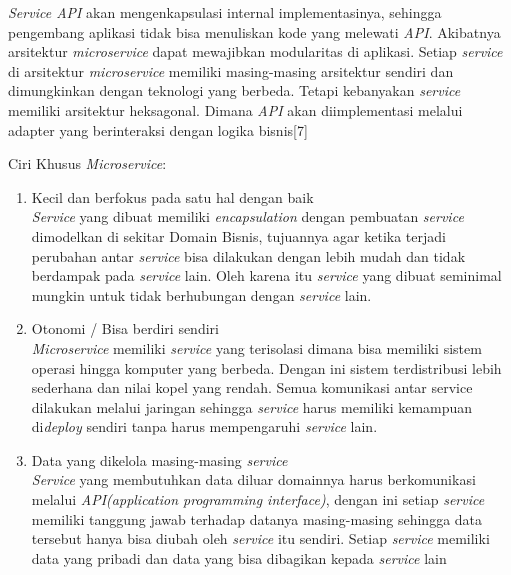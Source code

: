 \textit{Service API} akan mengenkapsulasi internal implementasinya, sehingga pengembang aplikasi tidak bisa menuliskan kode yang melewati \textit{API}. Akibatnya arsitektur \textit{microservice} dapat mewajibkan modularitas di aplikasi.  Setiap \textit{service} di arsitektur \textit{microservice} memiliki masing-masing arsitektur sendiri dan dimungkinkan dengan teknologi yang berbeda. Tetapi kebanyakan \textit{service} memiliki arsitektur heksagonal. Dimana \textit{API} akan diimplementasi melalui adapter yang berinteraksi dengan logika bisnis[7]

Ciri Khusus \textit{Microservice}:	
\begin{enumerate}[leftmargin=1.3cm]
	\item Kecil dan berfokus pada satu hal dengan baik\\
	\textit{Service} yang dibuat memiliki \textit{encapsulation} dengan pembuatan \textit{service} dimodelkan di sekitar Domain Bisnis, tujuannya agar ketika terjadi perubahan antar \textit{service} bisa dilakukan dengan lebih mudah dan tidak berdampak pada \textit{service} lain. Oleh karena itu \textit{service} yang dibuat seminimal mungkin untuk tidak berhubungan dengan \textit{service} lain. 
	\item Otonomi / Bisa berdiri sendiri\\
	\textit{Microservice} memiliki \textit{service} yang terisolasi dimana bisa memiliki sistem operasi hingga komputer yang berbeda. Dengan ini sistem terdistribusi lebih sederhana dan nilai kopel yang rendah. Semua komunikasi antar service dilakukan melalui jaringan sehingga \textit{service} harus memiliki kemampuan di\textit{deploy} sendiri tanpa harus mempengaruhi \textit{service} lain.
	\item Data yang dikelola masing-masing \textit{service}\\
	\textit{Service} yang membutuhkan data diluar domainnya harus berkomunikasi melalui \textit{API(application programming interface)}, dengan ini setiap \textit{service} memiliki tanggung jawab terhadap datanya masing-masing sehingga data tersebut hanya bisa diubah oleh \textit{service} itu sendiri. Setiap \textit{service} memiliki data yang pribadi dan data yang bisa dibagikan kepada \textit{service} lain
\end{enumerate}	

